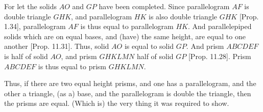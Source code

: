 \begin{Parallel}{}{}
{For let the solids $AO$ and $GP$ have been completed. 
Since parallelogram $AF$ is double triangle $GHK$, and parallelogram
$HK$ is also double triangle $GHK$ [Prop. 1.34],
parallelogram $AF$ is thus equal to parallelogram $HK$. And parallelepiped
solids which are on equal bases, and (have) the same height, are equal
to one another [Prop. 11.31]. Thus, solid
$AO$ is equal to solid $GP$.  And prism $ABCDEF$ is half of solid
$AO$, and prism $GHKLMN$ half of solid $GP$ [Prop. 11.28]. Prism $ABCDEF$ is thus equal to prism $GHKLMN$.

Thus, if there are two equal height prisms,
and one has a parallelogram, and the other a triangle,  (as a) base, 
and the parallelogram is double the triangle, then the prisms are equal.
(Which is) the very thing it was required to show.}
\end{Parallel}
